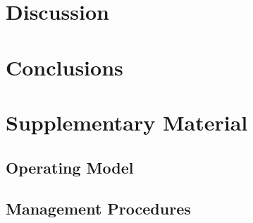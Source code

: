 \documentclass[11pt]{article}
\begin{document}
\section{Discussion}
\section{Conclusions}


\newpage
\section{Supplementary Material}

\subsection{Operating Model}




\newpage\clearpage
\subsection{Management Procedures}




\newpage\clearpage\clearpage
 
 
\end{document}
